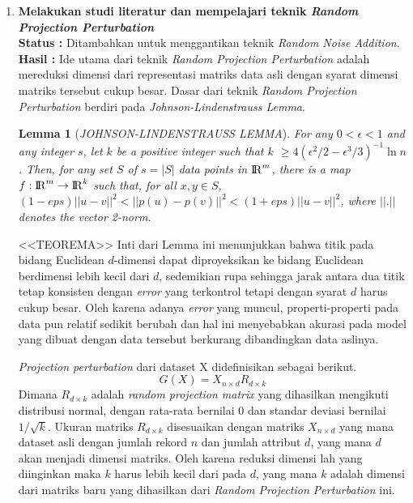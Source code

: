 \documentclass[a4paper,twoside]{article}
\begin{document}
\begin{enumerate}
		\item \textbf{Melakukan studi literatur dan mempelajari teknik \textit{Random Projection Perturbation}} \\
		{\bf Status :} Ditambahkan untuk menggantikan teknik \textit{Random Noise Addition}.\\
		{\bf Hasil :} Ide utama dari teknik \textit{Random Projection Perturbation} adalah mereduksi dimensi dari representasi matriks data asli dengan syarat dimensi matriks tersebut cukup besar. Dasar dari teknik \textit{Random Projection Perturbation} berdiri pada \textit{Johnson-Lindenstrauss Lemma}. 
		\newtheorem{theorem}{Lemma}
		\begin{theorem}[\textit{JOHNSON-LINDENSTRAUSS LEMMA}]
			For any \(0 < \epsilon < 1\) and any integer \(s\), let \(k\) be a positive integer such that \(k\) \(\geq 4(\epsilon^{2}/2-\epsilon^{3}/3)^{-1}\ln{n}\). Then, for any set \(S\) of \(s = |S|\) data points in \({\rm I\!R}^{m}\), there is a map \(f : {\rm I\!R}^{m} \rightarrow {\rm I\!R}^{k}\) such that, for all \(x, y \in S\), \((1-eps)||u - v||^{2}<||p(u) - p(v)||^{2}<(1+eps)||u - v||^{2}\), where \(||.||\) denotes the vector 2-norm.
		\end{theorem}
		<<TEOREMA>>
		Inti dari Lemma ini menunjukkan bahwa titik pada bidang Euclidean \(d\)-dimensi dapat diproyeksikan ke bidang Euclidean berdimensi lebih kecil dari \(d\), sedemikian rupa sehingga jarak antara dua titik tetap konsisten dengan \textit{error} yang terkontrol tetapi dengan syarat \(d\) harus cukup besar. Oleh karena adanya \textit{error} yang muncul, properti-properti pada data pun relatif sedikit berubah dan hal ini menyebabkan akurasi pada model yang dibuat dengan data tersebut berkurang dibandingkan data aslinya.
		
		\textit{Projection perturbation} dari dataset X didefinisikan sebagai berikut.
		\begin{equation}
			G(X) = X_{n \times d} R_{d \times k}
		\end{equation}
		Dimana \(R_{d \times k}\) adalah \textit{random projection matrix} yang dihasilkan mengikuti distribusi normal, dengan rata-rata bernilai 0 dan standar deviasi bernilai \(1/\sqrt{k}\). Ukuran matriks \(R_{d \times k}\) disesuaikan dengan matriks \(X_{n \times d}\) yang mana dataset asli dengan jumlah rekord \(n\) dan jumlah attribut \(d\), yang mana \(d\) akan menjadi dimensi matriks. Oleh karena reduksi dimensi lah yang diinginkan maka \(k\) harus lebih kecil dari pada \(d\), yang mana \(k\) adalah dimensi dari matriks baru yang dihasilkan dari \textit{Random Projection Perturbation} ini.
		

\end{enumerate}
\end{document}
